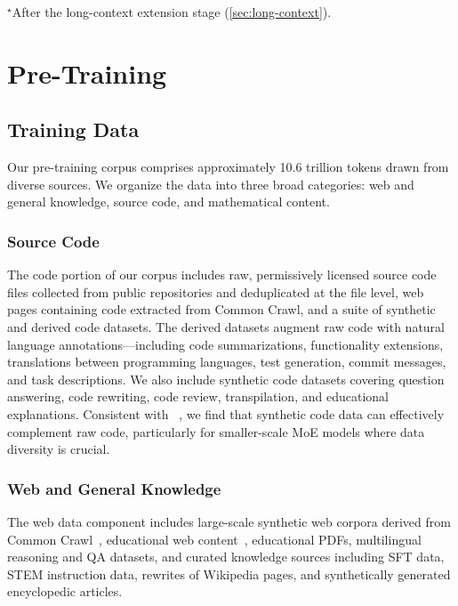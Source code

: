 \documentclass[11pt,a4paper]{article}
\begin{document}
\begin{table}[!tb]
  \vspace{4pt}
  {\footnotesize $^{\star}$After the long-context extension stage
  (\cref{sec:long-context}).}
\end{table}


\section{Pre-Training}
\label{sec:pretraining}

\subsection{Training Data}
\label{sec:data}

Our pre-training corpus comprises approximately 10.6 trillion tokens drawn from
diverse sources. We organize the data into three broad categories: web and
general knowledge, source code, and mathematical content.

\subsubsection{Source Code}

The code portion of our corpus includes raw, permissively licensed source code files
collected from public repositories and deduplicated at the file level, web pages
containing code extracted from Common Crawl, and a suite of synthetic and derived code
datasets. The derived datasets augment raw code with natural language
annotations---including code summarizations, functionality extensions,
translations between programming languages, test generation, commit messages,
and task descriptions. We also include synthetic code datasets covering
question answering, code rewriting, code review, transpilation, and
educational explanations. Consistent with ~\cite{hui2024qwen25coder}, we find that
synthetic code data can effectively complement raw code, particularly for
smaller-scale MoE models where data diversity is crucial.

\subsubsection{Web and General Knowledge}

The web data component includes large-scale synthetic web corpora derived
from Common Crawl~\cite{su2024nemotroncc}, educational web
content~\cite{penedo2024fineweb}, educational PDFs, multilingual reasoning
and QA datasets, and curated knowledge sources including SFT data, STEM
instruction data, rewrites of Wikipedia pages, and synthetically generated encyclopedic articles.
\end{document}
